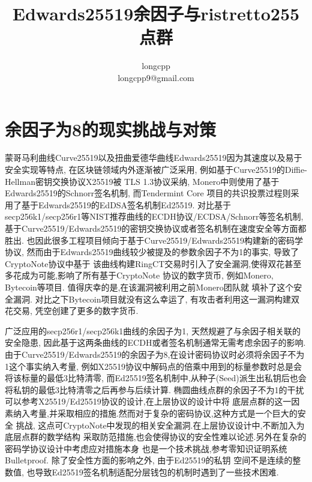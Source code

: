 \documentclass{article}
\begin{document}
\title{Edwards25519余因子与ristretto255点群}
\author{longcpp \\ \small{longcpp9@gmail.com}}

\maketitle

\section{余因子为8的现实挑战与对策}

蒙哥马利曲线Curve25519以及扭曲爱德华曲线Edwards25519因为其速度以及易于安全实现等特点,
在区块链领域内外逐渐被广泛采用, 例如基于Curve25519的Diffie-Hellman密钥交换协议X25519被
TLS 1.3协议采纳, Monero中则使用了基于Edwards25519的Schnorr签名机制, 而Tendermint Core
项目的共识投票过程则采用了基于Edwards25519的EdDSA签名机制Ed25519. 
对比基于secp256k1/secp256r1等NIST推荐曲线的ECDH协议/ECDSA/Schnorr等签名机制, 
基于Curve25519/Edwards25519的密钥交换协议或者签名机制在速度安全等方面都胜出.
也因此很多工程项目倾向于基于Curve25519/Edwards25519构建新的密码学协议,
然而由于Edwards25519曲线较少被提及的参数余因子不为1的事实, 导致了CryptoNote协议中基于
该曲线构建RingCT交易时引入了安全漏洞,使得双花甚至多花成为可能,影响了所有基于CryptoNote
协议的数字货币, 例如Monero, Bytecoin等项目. 值得庆幸的是,在该漏洞被利用之前Monero团队就
填补了这个安全漏洞. 对比之下Bytecoin项目就没有这么幸运了, 有攻击者利用这一漏洞构建双花交易,
凭空创建了更多的数字货币.

广泛应用的secp256r1/secp256k1曲线的余因子为1, 天然规避了与余因子相关联的安全隐患,
因此基于这两条曲线的ECDH或者签名机制通常无需考虑余因子的影响.
由于Curve25519/Edwards25519的余因子为8,在设计密码协议时必须将余因子不为1这个事实纳入考量,
例如X25519协议中解码点的倍乘中用到的标量参数时总是会将该标量的最低3比特清零,
而Ed25519签名机制中,从种子(Seed)派生出私钥后也会将私钥的最低3比特清零之后再参与后续计算.
椭圆曲线点群的余因子不为1的干扰可以参考X25519/Ed25519协议的设计,在上层协议的设计中将
底层点群的这一因素纳入考量,并采取相应的措施.然而对于复杂的密码协议,这种方式是一个巨大的安全
挑战, 这点可CryptoNote中发现的相关安全漏洞.在上层协议设计中,不断加入为底层点群的数学结构
采取防范措施,也会使得协议的安全性难以论述.另外在复杂的密码学协议设计中考虑应对措施本身
也是一个技术挑战,参考零知识证明系统Bulletproof. 除了安全性方面的影响之外, 由于Ed25519的私钥
空间不是连续的整数值, 也导致Ed25519签名机制适配分层钱包的机制时遇到了一些技术困难. 
\end{document}
